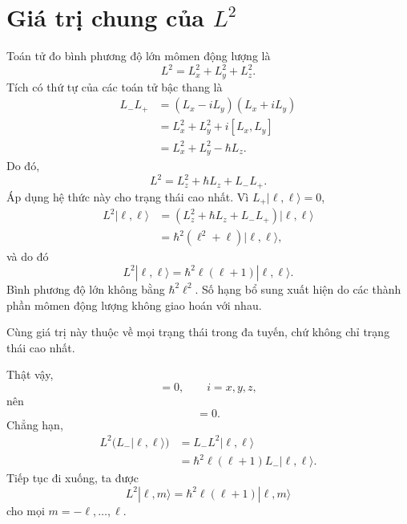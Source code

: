 \section{Giá trị chung của \texorpdfstring{\(L^2\)}{L bình phương}}

Toán tử đo bình phương độ lớn mômen động lượng là
\begin{equation}
L^2=L_x^2+L_y^2+L_z^2.
\end{equation}
Tích có thứ tự của các toán tử bậc thang là
\begin{align}
L_-L_+
&=(L_x-iL_y)(L_x+iL_y) \\
&=L_x^2+L_y^2+i[L_x,L_y] \\
&=L_x^2+L_y^2-\hbar L_z.
\end{align}
Do đó,
\begin{equation}
L^2=L_z^2+\hbar L_z+L_-L_+.
\end{equation}
Áp dụng hệ thức này cho trạng thái cao nhất. Vì \(L_+|\ell,\ell\rangle=0\),
\begin{align}
L^2|\ell,\ell\rangle
&=\left(L_z^2+\hbar L_z+L_-L_+\right)|\ell,\ell\rangle \\
&=\hbar^2\left(\ell^2+\ell\right)|\ell,\ell\rangle,
\end{align}
và do đó
\begin{equation}
L^2|\ell,\ell\rangle
=\hbar^2\ell(\ell+1)|\ell,\ell\rangle.
\end{equation}
Bình phương độ lớn không bằng \(\hbar^2\ell^2\). Số hạng bổ sung xuất hiện do các thành phần mômen động lượng không giao hoán với nhau.

Cùng giá trị này thuộc về mọi trạng thái trong đa tuyến, chứ không chỉ trạng thái cao nhất.

\begin{classroomqa}\end{classroomqa}

Thật vậy,
\begin{equation}
[L^2,L_i]=0,
\qquad i=x,y,z,
\end{equation}
nên
\begin{equation}
[L^2,L_\pm]=0.
\end{equation}
Chẳng hạn,
\begin{align}
L^2\bigl(L_-|\ell,\ell\rangle\bigr)
&=L_-L^2|\ell,\ell\rangle \\
&=\hbar^2\ell(\ell+1)L_-|\ell,\ell\rangle.
\end{align}
Tiếp tục đi xuống, ta được
\begin{equation}
L^2|\ell,m\rangle
=\hbar^2\ell(\ell+1)|\ell,m\rangle
\end{equation}
cho mọi \(m=-\ell,\ldots,\ell\).


